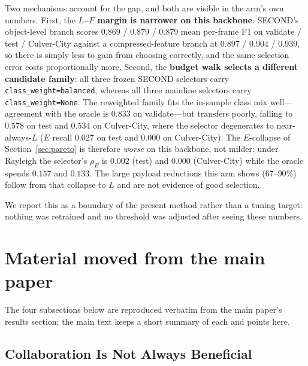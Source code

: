 \documentclass[journal]{IEEEtran}
\begin{document}
Two mechanisms account for the gap, and both are visible in the arm's own numbers. First, the
\textbf{$L$--$F$ margin is narrower on this backbone}: SECOND's object-level branch scores $0.869$ /
$0.879$ / $0.879$ mean per-frame F1 on validate / test / Culver-City against a compressed-feature
branch at $0.897$ / $0.904$ / $0.939$, so there is simply less to gain from choosing correctly, and
the same selection error costs proportionally more. Second, the \textbf{budget walk selects a
different candidate family}: all three frozen SECOND selectors carry \texttt{class\_weight=balanced},
whereas all three mainline selectors carry \texttt{class\_weight=None}. The reweighted family fits
the in-sample class mix well---agreement with the oracle is $0.833$ on validate---but transfers
poorly, falling to $0.578$ on test and $0.534$ on Culver-City, where the selector degenerates to
near-always-$L$ ($E$ recall $0.027$ on test and $0.000$ on Culver-City). The $E$-collapse of
Section~\ref{sec:pareto} is therefore \emph{worse} on this backbone, not milder: under Rayleigh the
selector's $\rho_E$ is $0.002$ (test) and $0.000$ (Culver-City) while the oracle spends $0.157$ and
$0.133$. The large payload reductions this arm shows ($67$--$90\%$) follow from that collapse to $L$
and are not evidence of good selection.

We report this as a boundary of the present method rather than a tuning target: nothing was
retrained and no threshold was adjusted after seeing these numbers.



\section{Material moved from the main paper}\label{sec:moved}
The four subsections below are reproduced verbatim from the main paper's results section;
the main text keeps a short summary of each and points here.

\subsection{Collaboration Is Not Always Beneficial}\label{sec:harm}
\end{document}
